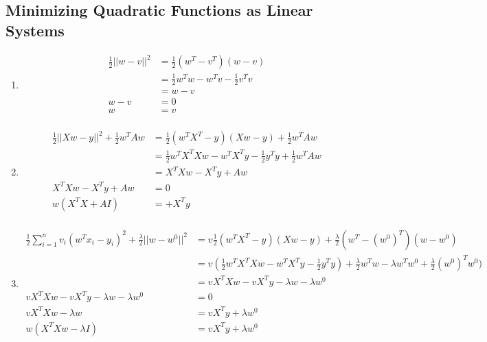 \documentclass{article}
\begin{document}
\subsection{Minimizing Quadratic Functions as Linear Systems}
\begin{enumerate}
    \item 
    \begin{equation*}
        \begin{split}
        \frac{1}{2}||w-v||^2 &= \frac{1}{2}(w^T-v^T)(w-v)\\
        &= \frac{1}{2}w^Tw-w^Tv-\frac{1}{2}v^Tv\\
        &= w - v \\
        w - v &= 0 \\
        w &= v\\
        \end{split}
    \end{equation*}
    \item 
    \begin{equation*}
        \begin{split}
        \frac{1}{2}||Xw-y||^2+\frac{1}{2}w^TAw &= \frac{1}{2}(w^TX^T-y)(Xw-y)+\frac{1}{2}w^TAw \\
        &= \frac{1}{2}w^TX^TXw - w^TX^Ty - \frac{1}{2}y^Ty + \frac{1}{2}w^TAw\\
        &= X^TXw - X^Ty + Aw\\
        X^TXw - X^Ty + Aw &= 0\\
        w(X^TX + AI) &= + X^Ty\\
        \end{split}
    \end{equation*}
    \item 
    \begin{equation*}
        \begin{split}
        \frac{1}{2}\sum_{i=1}^{n}v_i(w^Tx_i-y_i)^2+\frac{\lambda}{2}||w-w^0||^2 &= v\frac{1}{2}(w^TX^T-y)(Xw-y)+\frac{\lambda}{2}(w^T-(w^0)^T)(w-w^0)\\
        &= v(\frac{1}{2}w^TX^TXw - w^TX^Ty - \frac{1}{2}y^Ty)+\frac{\lambda}{2}w^Tw-\lambda w^Tw^0+\frac{\lambda}{2}(w^0)^Tw^0)\\
        &= vX^TXw-vX^Ty-\lambda w-\lambda w^0\\
        vX^TXw-vX^Ty-\lambda w-\lambda w^0 &= 0\\
        vX^TXw -\lambda w &= vX^Ty + \lambda w^0\\
        w(X^TXw -\lambda I) &= vX^Ty + \lambda w^0\\
        \end{split}
    \end{equation*}
\end{enumerate}
\end{document}
